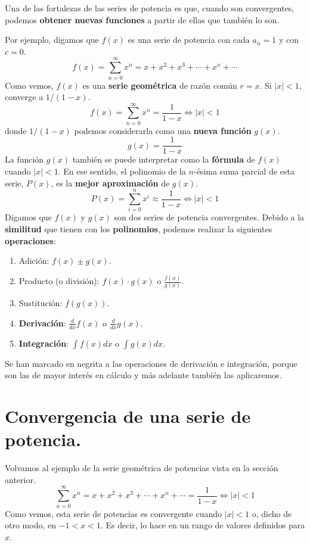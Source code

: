 \documentclass[12pt]{article}
\begin{document}
Una de las fortalezas de las series de potencia es que, cuando son convergentes, podemos \textbf{obtener nuevas funciones} a partir de ellas que también lo son.

Por ejemplo, digamos que $f(x)$ es una serie de potencia con cada $a_{n} = 1$ y con $c = 0$.
\[
  f(x) = \sum_{n = 0}^{\infty} x^{n} = x + x^{2} + x^{3} + \cdots + x^{n} + \cdots
\]
Como vemos, $f(x)$ es una \textbf{serie geométrica} de razón común $r = x$. Si $|x| < 1$, converge a $1/(1 - x)$.
\[
  f(x) = \sum_{n = 0}^{\infty} x^{n} = \frac{1}{1 - x} \iff |x| < 1
\]
donde $1/(1 - x)$ podemos considerarla como una \textbf{nueva función} $g(x)$.
\[
  g(x) = \frac{1}{1 - x}
\]
La función $g(x)$ también se puede interpretar como la \textbf{fórmula} de $f(x)$ cuando $|x| < 1$. En ese sentido, el polinomio de la $n$-ésima suma parcial de esta serie, $P(x)$, es la \textbf{mejor aproximación} de $g(x)$.
\[
  P(x) = \sum_{i = 0}^{n} x^{i} \approx \frac{1}{1 - x} \iff |x| < 1
\]
Digamos que $f(x)$ y $g(x)$ son dos series de potencia convergentes. Debido a la \textbf{similitud} que tienen con los \textbf{polinomios}, podemos realizar la siguientes \textbf{operaciones}:

\begin{enumerate}
\item Adición: $f(x) \pm g(x)$.
\item Producto (o división): $f(x) \cdot g(x)$ o $\frac{f(x)}{g(x)}$.
\item Sustitución: $f(g(x))$.
\item \textbf{Derivación}: $\frac{d}{dx} f(x)$ o $\frac{d}{dx} g(x)$.
\item \textbf{Integración}: $\int f(x)dx$ o $\int g(x)dx$.
\end{enumerate}

Se han marcado en negrita a las operaciones de derivación e integración, porque son las de mayor interés en cálculo y más adelante también las aplicaremos.


\section{Convergencia de una serie de potencia.}

Volvamos al ejemplo de la serie geométrica de potencias vista en la sección anterior.
\[
  \sum_{n = 0}^{\infty} x^{n} = x + x^{2} + x^{3} + \cdots + x^{n} + \cdots = \frac{1}{1 - x} \iff |x| < 1
\]
Como vemos, esta serie de potencias es convergente cuando $|x| < 1$ o, dicho de otro modo, en $-1 < x < 1$. Es decir, lo hace en un rango de valores definidos para $x$.
\end{document}
